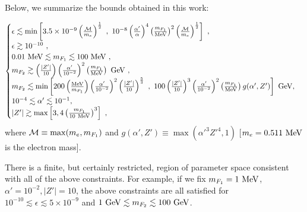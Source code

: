 \documentclass[12pt]{article}
\begin{document}
{{%

Below, we summarize the bounds obtained in this work:

\begin{eqnarray}
\begin{cases}
\epsilon \lesssim \min \left [3.5 \times 10 ^{-9} \left ( \frac{{\cal
M}}{m _e} \right ) ^{\frac{1}{2}} \ , \ 10 ^{-8} \left ( \frac{\alpha
'}{\alpha} \right ) ^4 \left ( \frac{m _{F_1}}{\rm MeV} \right ) ^2
\left ( \frac{{\cal M}}{m _e} \right ) ^{\frac{1}{2}} \right ] \ , \\
\epsilon \gtrsim 10 ^{-10} \ , \\
0.01 \ {\rm MeV} \lesssim m _{F_1} \lesssim 100 \ {\rm MeV} \ , \\
m _{F_2} \gtrsim \left (\frac{|Z'|}{10} \right )\left (\frac{\alpha
'}{10 ^{-2}} \right ) ^2\left ( \frac{m _{F_1}}{\rm MeV} \right ) \ {\rm
GeV} \ , \\
m _{F_2} \lesssim \min \left [200 \left ( \frac{\rm MeV}{m _{F_1}}
\right )\left ( \frac{\alpha '}{10 ^{-2}} \right ) ^2\left (
\frac{|Z'|}{10} \right ) ^{\frac{5}{3}} \ , \ 100 \left (
\frac{|Z'|}{10} \right ) ^3\left (\frac{\alpha '}{10 ^{-2}} \right )
^2\left ( \frac{m _{F_1}}{\rm MeV} \right )g(\alpha ',Z') \right ] \
{\rm GeV} , \\
10 ^{-4} \lesssim \alpha ' \lesssim 10 ^{-1} , \\
|Z'| \gtrsim \max \left [ 3, 4 \left ( \frac{m _{F_1}}{10 \ \rm MeV}
\right ) ^3 \right ] \ ,
\end{cases}
\label{boundsinterrelated}
\end{eqnarray}
%
where ${\cal M} \equiv \max ( m _e, m _{F_1} )$ and $g (\alpha ',Z')
\equiv \max ({\alpha '} ^3{Z'} ^4,1)$ [$m _e = 0.511 \ {\rm MeV}$ is the
electron mass].

There is a finite, but certainly restricted, region of parameter space
consistent with all of the above constraints. For example, if we fix $m
_{F_1} = 1 \ \rm  MeV$, $\alpha ' = 10 ^{-2}, |Z'|=10$, the above
constraints are all satisfied for $10 ^{-10} \lesssim \epsilon \lesssim
5 \times 10 ^{-9}$ and $1 \ {\rm GeV} \lesssim m _{F_2} \lesssim 100 \
{\rm GeV}$.

}}
\end{document}
